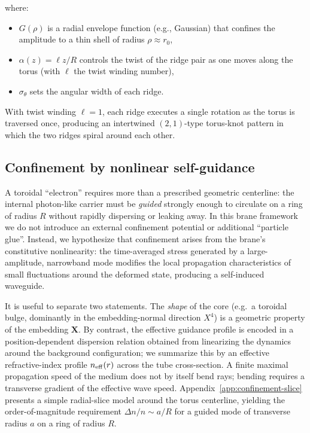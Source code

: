 where:
\begin{itemize}
\item $G(\rho)$ is a radial envelope function (e.g., Gaussian) that confines the
  amplitude to a thin shell of radius $\rho \approx r_0$,
\item $\alpha(z) = \ell z / R$ controls the twist of the ridge pair as one moves
  along the torus (with $\ell$ the twist winding number),
\item $\sigma_\theta$ sets the angular width of each ridge.
\end{itemize}

With twist winding $\ell=1$, each ridge executes a single rotation as the torus
is traversed once, producing an intertwined $(2,1)$-type torus-knot pattern in
which the two ridges spiral around each other.


\subsection{Confinement by nonlinear self-guidance}
\label{subsec:electron-confinement}

A toroidal ``electron'' requires more than a prescribed geometric centerline: the internal
photon-like carrier must be \emph{guided} strongly enough to circulate on a ring of radius $R$
without rapidly dispersing or leaking away.
In this brane framework we do not introduce an external confinement potential or additional
``particle glue''. Instead, we hypothesize that confinement arises from the brane's constitutive
nonlinearity: the time-averaged stress generated by a large-amplitude, narrowband mode modifies the
local propagation characteristics of small fluctuations around the deformed state, producing a
self-induced waveguide.

It is useful to separate two statements. The \emph{shape} of the core (e.g.\ a toroidal bulge,
dominantly in the embedding-normal direction $X^4$) is a geometric property of the embedding
$\mathbf X$. By contrast, the effective guidance profile is encoded in a position-dependent
dispersion relation obtained from linearizing the dynamics around the background configuration; we
summarize this by an effective refractive-index profile $n_{\rm eff}(r)$ across the tube cross-section.
A finite maximal propagation speed of the medium does not by itself bend rays; bending requires a
transverse gradient of the effective wave speed.
Appendix~\ref{app:confinement-slice} presents a simple radial-slice model around the torus centerline,
yielding the order-of-magnitude requirement $\Delta n/n\sim a/R$ for a guided mode of transverse radius
$a$ on a ring of radius $R$.

